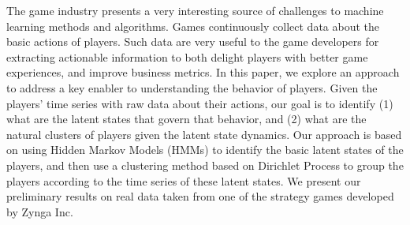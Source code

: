 The game industry presents a very interesting source of challenges to machine learning methods and algorithms.  Games continuously collect data about the basic actions of players. Such data are very useful to the game developers for extracting actionable information to both delight players with better game experiences, and improve business metrics. In this paper, we explore an approach to address a key enabler to understanding the behavior of players. Given the players' time series with raw data about  their  actions, our goal is to identify (1) what are the latent states that govern that behavior, and (2) what are the natural clusters of players given the latent state dynamics.   Our approach is based on using Hidden Markov Models (HMMs) to identify the basic latent states of the players, and then use a clustering method based on Dirichlet Process to group the players according to the time series of these latent states. We present our preliminary results on real data taken from  one of the strategy games developed by Zynga Inc.\  



